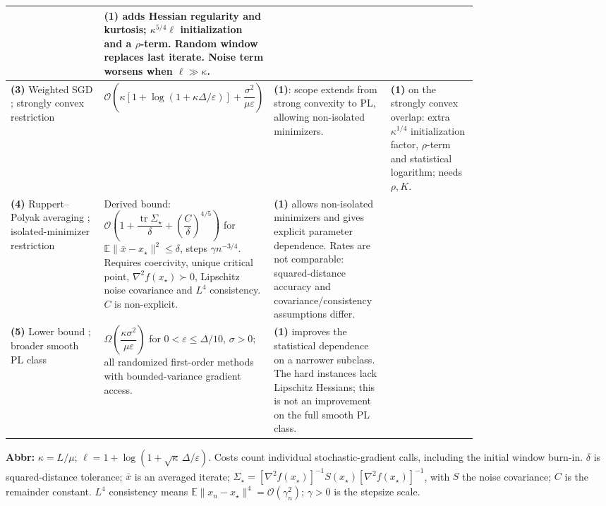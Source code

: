 \begin{table}[tp]
\begin{threeparttable}
\begin{tabularx}{\linewidth}{@{}>{\raggedright\arraybackslash}p{0.20\linewidth}>{\raggedright\arraybackslash}p{0.32\linewidth}>{\raggedright\arraybackslash}p{0.25\linewidth}>{\raggedright\arraybackslash}X@{}}
& \textbf{(1)} adds Hessian regularity and kurtosis; $\kappa^{5/4}\ell$ initialization and a $\rho$-term. Random window replaces last iterate. Noise term worsens when $\ell\gg\kappa$. \\
\midrule
\textbf{(3)} Weighted SGD \citep[Thm.~5]{plhkStich2019v2}; strongly convex restriction
& $\mathcal{O}\!\left(\kappa[1+\log(1+\kappa\Delta/\varepsilon)]+\dfrac{\sigma^2}{\mu\varepsilon}\right)$
& \textbf{(1)}: scope extends from strong convexity to PL, allowing non-isolated minimizers.
& \textbf{(1)} on the strongly convex overlap: extra $\kappa^{1/4}$ initialization factor, $\rho$-term and statistical logarithm; needs $\rho,K$. \\
\midrule
\textbf{(4)} Ruppert--Polyak averaging \citep[Thm.~2]{plhkGadatPanloup2017v1}; isolated-minimizer restriction
& Derived bound: $\mathcal{O}\!\left(1+\dfrac{\operatorname{tr}\Sigma_\star}{\delta}+\left(\dfrac{C}{\delta}\right)^{4/5}\right)$ for $\mathbb{E}\|\bar x-x_\star\|^2\leq\delta$, steps $\gamma n^{-3/4}$. Requires coercivity, unique critical point, $\nabla^2 f(x_\star)\succ0$, Lipschitz noise covariance and $L^4$ consistency. $C$ is non-explicit.
& \textbf{(1)} allows non-isolated minimizers and gives explicit parameter dependence. Rates are not comparable: squared-distance accuracy and covariance/consistency assumptions differ.
& \\
\midrule
\textbf{(5)} Lower bound \citep[Thm.~4.3, Rem.~4.6]{plhkMasiha2026v3}; broader smooth PL class
& $\Omega\!\left(\dfrac{\kappa\sigma^2}{\mu\varepsilon}\right)$ for $0<\varepsilon\leq\Delta/10$, $\sigma>0$; all randomized first-order methods with bounded-variance gradient access.
& \textbf{(1)} improves the statistical dependence on a narrower subclass. The hard instances lack Lipschitz Hessians; this is not an improvement on the full smooth PL class.
& \\
\bottomrule
\end{tabularx}
\begin{tablenotes}[flushleft]\footnotesize
\item[] \textbf{Abbr:} $\kappa=L/\mu$; $\ell=1+\log(1+\sqrt\kappa\,\Delta/\varepsilon)$. Costs count individual stochastic-gradient calls, including the initial window burn-in. $\delta$ is squared-distance tolerance; $\bar x$ is an averaged iterate; $\Sigma_\star=[\nabla^2 f(x_\star)]^{-1}S(x_\star)[\nabla^2 f(x_\star)]^{-1}$, with $S$ the noise covariance; $C$ is the remainder constant. $L^4$ consistency means $\mathbb{E}\|x_n-x_\star\|^4=\mathcal{O}(\gamma_n^2)$; $\gamma>0$ is the stepsize scale.
\end{tablenotes}
\end{threeparttable}
\end{table}
\clearpage

